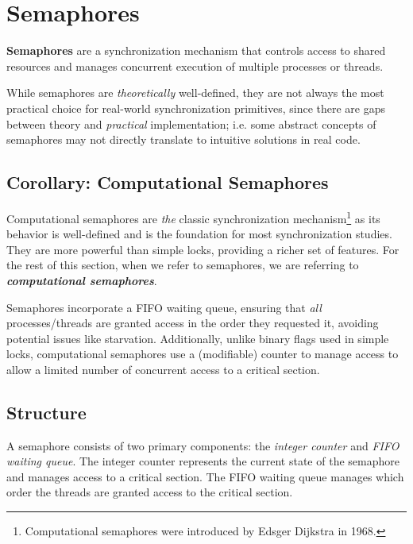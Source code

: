 \documentclass{report}
\newcommand{\definitionBegin}[1]{\begin{tcolorbox}[title={Definition: #1}]}
\newcommand{\definitionEnd}{\end{tcolorbox}}
\newcommand{\exampleBegin}[1]{\begin{tcolorbox}[colback=blue!5!white,colframe=black!75!blue,title={Example:
      #1}]}
\newcommand{\exampleEnd}{\end{tcolorbox}}
\begin{document}
\section{Semaphores}
\definitionBegin{Semaphores}
\textbf{Semaphores} are a synchronization mechanism that controls access to shared resources and
manages concurrent execution of multiple processes or threads.
\definitionEnd

While semaphores are \textit{theoretically} well-defined, they are not always the most practical
choice for real-world synchronization primitives, since there are gaps between theory and
\textit{practical} implementation; i.e. some abstract concepts of semaphores may not directly
translate to intuitive solutions in real code. 





\subsection*{Corollary: Computational Semaphores}
Computational semaphores are \textit{the} classic synchronization mechanism\footnote{Computational
  semaphores were introduced by Edsger Dijkstra in 1968.} as its behavior is well-defined and is
the foundation for most synchronization studies. They are more powerful than simple locks, providing
a richer set of features. For the rest of this section, when we refer to semaphores, we are
referring to \textit{\textbf{computational semaphores}}.

\exampleBegin{Waiting in Line}
Semaphores incorporate a FIFO waiting queue, ensuring that \textit{all} processes/threads are
granted access in the order they requested it, avoiding potential issues like
starvation. Additionally, unlike binary flags used in simple locks, computational semaphores use a
(modifiable) counter to manage access to allow a limited number of concurrent access to a critical section. 
\exampleEnd

\subsection{Structure}
A semaphore consists of two primary components: the \textit{integer counter} and \textit{FIFO
  waiting queue}. The integer counter represents the current state of the semaphore and manages
access to a critical section. The FIFO waiting queue manages which order the
threads are granted access to the critical section.
\end{document}
